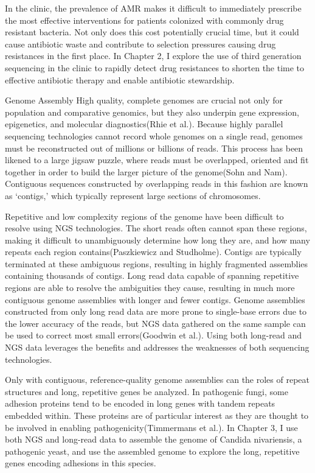 In the clinic, the prevalence of AMR makes it difficult to immediately prescribe the most effective interventions for patients colonized with commonly drug resistant bacteria. Not only does this cost potentially crucial time, but it could cause antibiotic waste and contribute to selection pressures causing drug resistances in the first place. In Chapter 2, I explore the use of third generation sequencing in the clinic to rapidly detect drug resistances to shorten the time to effective antibiotic therapy and enable antibiotic stewardship.

Genome Assembly
High quality, complete genomes are crucial not only for population and comparative genomics, but they also underpin gene expression, epigenetics, and molecular diagnostics(Rhie et al.). Because highly parallel sequencing technologies cannot record whole genomes on a single read, genomes must be reconstructed out of millions or billions of reads. This process has been likened to a large jigsaw puzzle, where reads must be overlapped, oriented and fit together in order to build the larger picture of the genome(Sohn and Nam). Contiguous sequences constructed by overlapping reads in this fashion are known as ‘contigs,’ which typically represent large sections of chromosomes.

Repetitive and low complexity regions of the genome have been difficult to resolve using NGS technologies. The short reads often cannot span these regions, making it difficult to unambiguously determine how long they are, and how many repeats each region contains(Paszkiewicz and Studholme). Contigs are typically terminated at these ambiguous regions, resulting in highly fragmented assemblies containing thousands of contigs. Long read data capable of spanning repetitive regions are able to resolve the ambiguities they cause, resulting in much more contiguous genome assemblies with longer and fewer contigs. Genome assemblies constructed from only long read data are more prone to single-base errors due to the lower accuracy of the reads, but NGS data gathered on the same sample can be used to correct most small errors(Goodwin et al.). Using both long-read and NGS data leverages the benefits and addresses the weaknesses of both sequencing technologies.

Only with contiguous, reference-quality genome assemblies can the roles of repeat structures and long, repetitive genes be analyzed. In pathogenic fungi, some adhesion proteins tend to be encoded in long genes with tandem repeats embedded within. These proteins are of particular interest as they are thought to be involved in enabling pathogenicity(Timmermans et al.). In Chapter 3, I use both NGS and long-read data to assemble the genome of Candida nivariensis, a pathogenic yeast, and use the assembled genome to explore the long, repetitive genes encoding adhesions in this species.

